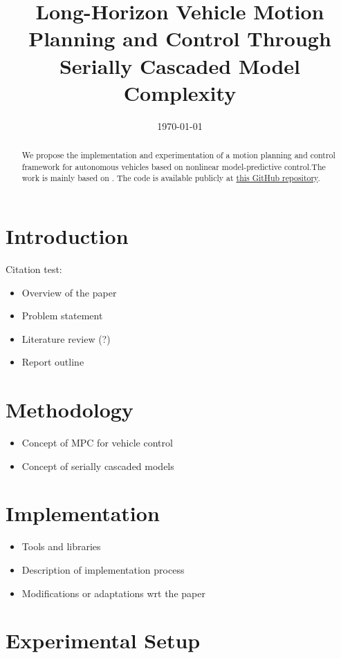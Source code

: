 \documentclass[a4paper, twocolumn, 11pt, twoside]{article}
\title{Long-Horizon Vehicle Motion Planning and Control Through Serially Cascaded Model Complexity}
\author{}
\date{\today}
\begin{document}
\maketitle

\begin{abstract}
    We propose the implementation and experimentation of a motion planning and
    control framework for autonomous vehicles based on nonlinear
    model-predictive control.The work is mainly based on \cite{paper}. The code is available publicly at
    \href{https://github.com/neverorfrog/vehicle-control}{this GitHub
    repository}. 
\end{abstract}


\section{Introduction}

Citation test:

\begin{itemize}
    \item Overview of the paper
    \item Problem statement
    \item Literature review (?)
    \item Report outline
\end{itemize}

\section{Methodology}

\begin{itemize}
    \item Concept of MPC for vehicle control
    \item Concept of serially cascaded models
\end{itemize}

\section{Implementation}

\begin{itemize}
    \item Tools and libraries
    \item Description of implementation process
    \item Modifications or adaptations wrt the paper
\end{itemize}

\section{Experimental Setup}
\end{document}
